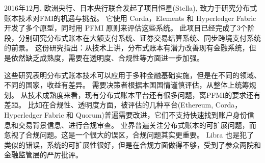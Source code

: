 
2016年12月, 欧洲央行、日本央行联合发起了项目恒星(Stella), 致力于研究分布式账本技术对FMI的机遇与挑战。
它使用 Corda，Elements 和 Hyperledger Fabric 开发了多个原型，同时用 PFMI 原则来评估这些系统。
此项目已经完成了3个阶段，分别研究分布式账本在大额支付系统\cite{stellar1}、证券交易结算系统\cite{stellar2}、同步跨境支付系统\cite{stellar3}的前景。
这份研究指出：从技术上讲，分布式账本有潜力改善现有金融系统，但是依然缺乏成熟度，需要在透明度、合规性等方面进一步加强。


这些研究表明分布式账本技术可以应用于多种金融基础实施，但是在不同的领域、不同的国家，收益有差异。
需要决策者根据本国国情谨慎评估，从整体上统筹规划。
从技术成熟度来看，现有分布式账本平台还有很多问题，离PFMI的要求还有差距。
比如在合规性、透明度方面，被评估的几种平台(Ethereum, Corda，Hyperledger Fabric 和 Quorum)普遍需要改进，它们不支持快速找到账户身份信息和交易背景信息、进行合规审查。
业界普遍关注分布式账本的可扩展问题，而忽视了合规问题。这是一个很大的误区，合规问题其实更重要。
Libra 也是犯了类似的错误，系统的可扩展性很好，但是在合规方面做得不够，受到了参众两院和金融监管层的严厉批评。

